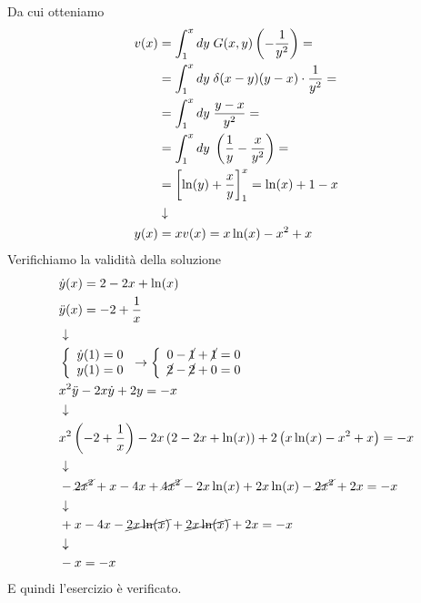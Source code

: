 Da cui otteniamo
\begin{align}
	v(x) &= \int_{1}^x dy \;G(x,y) \left(-\frac{1}{y^2}\right) = \nonumber \\
	&= \int_{1}^x dy \; \delta (x-y) (y-x) \cdot \frac{1}{y^2}= \nonumber \\
	&= \int_{1}^x dy \; \frac{y-x}{y^2}= \nonumber \\
	&= \int_{1}^x dy \; \left(\frac{1}{y} - \frac{x}{y^2}\right)= \nonumber \\
	&= \left[ \ln(y) + \frac{x}{y} \right]_1^x = \ln(x) +1 -x \nonumber \\ &\downarrow \nonumber \\
	y(x) &= xv(x) = x\ln(x) - x^2 +x
\end{align}
Verifichiamo la validità della soluzione
\begin{align}
	&\dot{y}(x) = 2 - 2x + \ln(x)\\
	&\ddot{y}(x) = -2 + \frac{1}{x} \\ &\downarrow \nonumber \\
	&\left\{ \begin{array}{cc} \dot{y}(1) = 0\\ y(1) = 0 \end{array} \right. \to \left\{ \begin{array}{cc} 0 -\cancel{1} +\cancel{1} =0\\ \cancel{2}-\cancel{2} + 0 =0 \end{array} \right.\\
	&x^2 \ddot{y} - 2x \dot{y} + 2y = -x \\ &\downarrow \nonumber \\
	&x^2 \left( -2 + \frac{1}{x} \right) -2x \left( 2 - 2x + \ln(x) \right) + 2 \left( x\ln(x) - x^2 +x \right) = -x \nonumber \\ &\downarrow \nonumber \\
	& -\cancel{2x^2} + x - 4x + \cancel{4x^2} - 2x\ln(x) + 2x\ln(x) -\cancel{2x^2} +2x = -x \nonumber \\ &\downarrow \nonumber \\
	& + x - 4x - \cancel{2x\ln(x)} + \cancel{2x\ln(x)} +2x = -x \nonumber \\ &\downarrow \nonumber \\
	& -x = -x
\end{align}
E quindi l'esercizio è verificato.

\newpage

